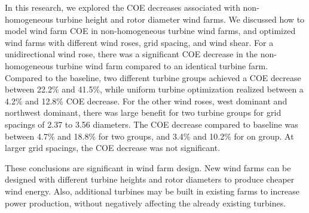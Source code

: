 \documentclass[conf]{new-aiaa}
\begin{document}
In this research, we explored the COE decreases associated with non-homogeneous turbine height and rotor diameter wind farms. We discussed how to model wind farm COE in non-homogeneous turbine wind farms, and optimized wind farms with different wind roses, grid spacing, and wind shear. For a unidirectional wind rose, there was a significant COE decrease in the non-homogeneous turbine wind farm compared to an identical turbine farm. Compared to the baseline, two different turbine groups achieved a COE decrease between 22.2\% and 41.5\%, while uniform turbine optimization realized between a 4.2\% and 12.8\% COE decrease. For the other wind roses, west dominant and northwest dominant, there was large benefit for two turbine groups for grid spacings of 2.37 to 3.56 diameters. The COE decrease compared to baseline was between 4.7\% and 18.8\% for two groups, and 3.4\% and 10.2\% for on group. At larger grid spacings, the COE decrease was not significant. 

These conclusions are significant in wind farm design. New wind farms can be designed with different turbine heights and rotor diameters to produce cheaper wind energy. Also, additional turbines may be built in existing farms to increase power production, without negatively affecting the already existing turbines. 
\end{document}
